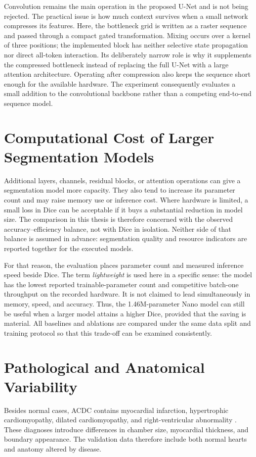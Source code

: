 Convolution remains the main operation in the proposed U-Net and is not being rejected. The practical issue is how much context survives when a small network compresses its features. Here, the bottleneck grid is written as a raster sequence and passed through a compact gated transformation. Mixing occurs over a kernel of three positions; the implemented block has neither selective state propagation nor direct all-token interaction. Its deliberately narrow role is why it supplements the compressed bottleneck instead of replacing the full U-Net with a large attention architecture. Operating after compression also keeps the sequence short enough for the available hardware. The experiment consequently evaluates a small addition to the convolutional backbone rather than a competing end-to-end sequence model.

\section{Computational Cost of Larger Segmentation Models}
Additional layers, channels, residual blocks, or attention operations can give a segmentation model more capacity. They also tend to increase its parameter count and may raise memory use or inference cost. Where hardware is limited, a small loss in Dice can be acceptable if it buys a substantial reduction in model size. The comparison in this thesis is therefore concerned with the observed accuracy--efficiency balance, not with Dice in isolation. Neither side of that balance is assumed in advance: segmentation quality and resource indicators are reported together for the executed models.

For that reason, the evaluation places parameter count and measured inference speed beside Dice. The term \emph{lightweight} is used here in a specific sense: the model has the lowest reported trainable-parameter count and competitive batch-one throughput on the recorded hardware. It is not claimed to lead simultaneously in memory, speed, and accuracy. Thus, the 1.46M-parameter Nano model can still be useful when a larger model attains a higher Dice, provided that the saving is material. All baselines and ablations are compared under the same data split and training protocol so that this trade-off can be examined consistently.

\section{Pathological and Anatomical Variability}
Besides normal cases, ACDC contains myocardial infarction, hypertrophic cardiomyopathy, dilated cardiomyopathy, and right-ventricular abnormality \citep{bernard2018deep}. These diagnoses introduce differences in chamber size, myocardial thickness, and boundary appearance. The validation data therefore include both normal hearts and anatomy altered by disease.

